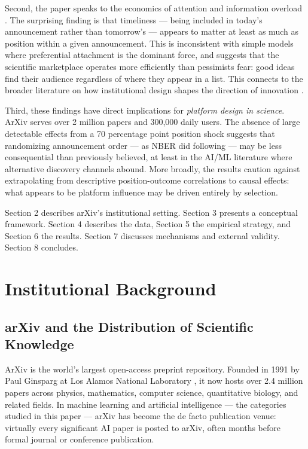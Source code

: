 \documentclass[12pt]{article}
\begin{document}
Second, the paper speaks to the economics of attention and information overload \citep{jones2009, bloom2020}. The surprising finding is that timeliness --- being included in today's announcement rather than tomorrow's --- appears to matter at least as much as position within a given announcement. This is inconsistent with simple models where preferential attachment \citep{barabasi1999, merton1968} is the dominant force, and suggests that the scientific marketplace operates more efficiently than pessimists fear: good ideas find their audience regardless of where they appear in a list. This connects to the broader literature on how institutional design shapes the direction of innovation \citep{li2017, hill2021, azoulay2014}.

Third, these findings have direct implications for \textit{platform design in science}. ArXiv serves over 2 million papers and 300,000 daily users. The absence of large detectable effects from a 70 percentage point position shock suggests that randomizing announcement order --- as NBER did following \citet{feenberg2017} --- may be less consequential than previously believed, at least in the AI/ML literature where alternative discovery channels abound. More broadly, the results caution against extrapolating from descriptive position-outcome correlations to causal effects: what appears to be platform influence may be driven entirely by selection.

Section 2 describes arXiv's institutional setting. Section 3 presents a conceptual framework. Section 4 describes the data, Section 5 the empirical strategy, and Section 6 the results. Section 7 discusses mechanisms and external validity. Section 8 concludes.


\section{Institutional Background}

\subsection{arXiv and the Distribution of Scientific Knowledge}

ArXiv is the world's largest open-access preprint repository. Founded in 1991 by Paul Ginsparg at Los Alamos National Laboratory \citep{ginsparg2011}, it now hosts over 2.4 million papers across physics, mathematics, computer science, quantitative biology, and related fields. In machine learning and artificial intelligence --- the categories studied in this paper --- arXiv has become the de facto publication venue: virtually every significant AI paper is posted to arXiv, often months before formal journal or conference publication.
\end{document}

